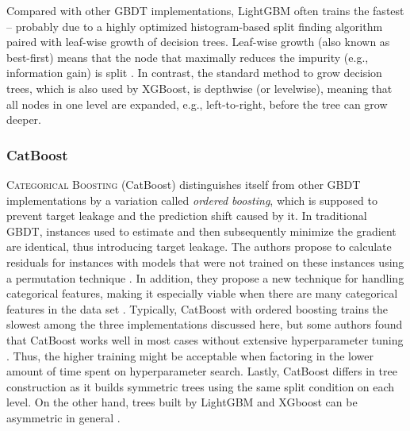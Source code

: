 Compared with other GBDT implementations, LightGBM often trains the fastest \parencite[1951--1954]{bentejac_comparative_2021} -- probably due to a highly optimized histogram-based split finding algorithm paired with leaf-wise growth of decision trees. Leaf-wise growth (also known as best-first) means that the node that maximally reduces the impurity (e.g., information gain) is split \parencite[3]{shi_best-first_2007}. In contrast, the standard method to grow decision trees, which is also used by XGBoost, is depthwise (or levelwise), meaning that all nodes in one level are expanded, e.g., left-to-right, before the tree can grow deeper. 

\subsubsection{CatBoost}

\textsc{Categorical Boosting} (CatBoost) distinguishes itself from other GBDT implementations by a variation called \textit{ordered boosting}, which is supposed to prevent target leakage and the prediction shift caused by it. In traditional GBDT, instances used to estimate and then subsequently minimize the gradient are identical, thus introducing target leakage. The authors propose to calculate residuals for instances with models that were not trained on these instances using a permutation technique \parencites[5]{prokhorenkova_catboost_2017}[1943--1944]{bentejac_comparative_2021}. In addition, they propose a new technique for handling categorical features, making it especially viable when there are many categorical features in the data set \parencite[1]{prokhorenkova_catboost_2017}. Typically, CatBoost with ordered boosting trains the slowest among the three implementations discussed here, but some authors found that CatBoost works well in most cases without extensive hyperparameter tuning \parencite[26]{florek_benchmarking_2023}. Thus, the higher training might be acceptable when factoring in the lower amount of time spent on hyperparameter search. Lastly, CatBoost differs in tree construction as it builds symmetric trees using the same split condition on each level. On the other hand, trees built by LightGBM and XGboost can be asymmetric in general \parencite[8]{florek_benchmarking_2023}.

